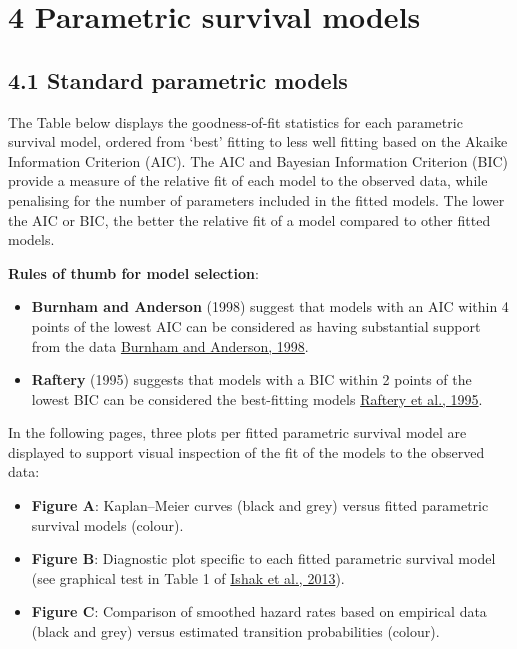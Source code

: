 \documentclass[
]{article}
\providecommand{\tightlist}{%
  \setlength{\itemsep}{0pt}\setlength{\parskip}{0pt}}
\begin{document}
\clearpage

\section{4 Parametric survival models}\label{parametric-survival-models}

\subsection{4.1 Standard parametric
models}\label{standard-parametric-models}

The Table below displays the goodness-of-fit statistics for each
parametric survival model, ordered from `best' fitting to less well
fitting based on the Akaike Information Criterion (AIC). The AIC and
Bayesian Information Criterion (BIC) provide a measure of the relative
fit of each model to the observed data, while penalising for the number
of parameters included in the fitted models. The lower the AIC or BIC,
the better the relative fit of a model compared to other fitted models.

\textbf{Rules of thumb for model selection}:

\begin{itemize}
\tightlist
\item
  \textbf{Burnham and Anderson} (1998) suggest that models with an AIC
  within 4 points of the lowest AIC can be considered as having
  substantial support from the data
  \href{https://doi.org/10.1007/978-1-4757-2917-7}{Burnham and Anderson,
  1998}.\\
\item
  \textbf{Raftery} (1995) suggests that models with a BIC within 2
  points of the lowest BIC can be considered the best-fitting models
  \href{https://doi.org/10.2307/271063}{Raftery et al., 1995}.
\end{itemize}

In the following pages, three plots per fitted parametric survival model
are displayed to support visual inspection of the fit of the models to
the observed data:

\begin{itemize}
\tightlist
\item
  \textbf{Figure A}: Kaplan--Meier curves (black and grey) versus fitted
  parametric survival models (colour).\\
\item
  \textbf{Figure B}: Diagnostic plot specific to each fitted parametric
  survival model (see graphical test in Table 1 of
  \href{https://doi.org/10.1007/s40273-013-0064-3}{Ishak et al., 2013}).
\item
  \textbf{Figure C}: Comparison of smoothed hazard rates based on
  empirical data (black and grey) versus estimated transition
  probabilities (colour).
\end{itemize}
\end{document}

